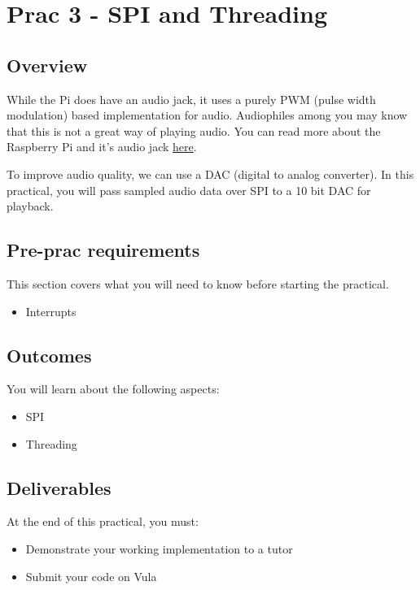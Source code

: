 \newpage
\section{Prac 3 - SPI and Threading}
\label{sec:Prac3}
\subsection{Overview}
While the Pi does have an audio jack, it uses a purely PWM (pulse width modulation) based implementation for audio. Audiophiles among you may know that this is not a great way of playing audio. You can read more about the Raspberry Pi and it's audio jack \href{https://hackaday.com/2018/07/13/behind-the-pin-how-the-raspberry-pi-gets-its-audio/}{here}.

To improve audio quality, we can use a DAC (digital to analog converter). In this practical, you will pass sampled audio data over SPI to a 10 bit DAC for playback. 

\subsection{Pre-prac requirements}
This section covers what you will need to know before starting the practical.
\begin{itemize}
    \item Interrupts
\end{itemize}

\subsection{Outcomes}
You will learn about the following aspects:
\begin{itemize}
    \item SPI
    \item Threading
\end{itemize}

\subsection{Deliverables}
At the end of this practical, you must:
\begin{itemize}
    \item Demonstrate your working implementation to a tutor
    \item Submit your code on Vula
\end{itemize}

